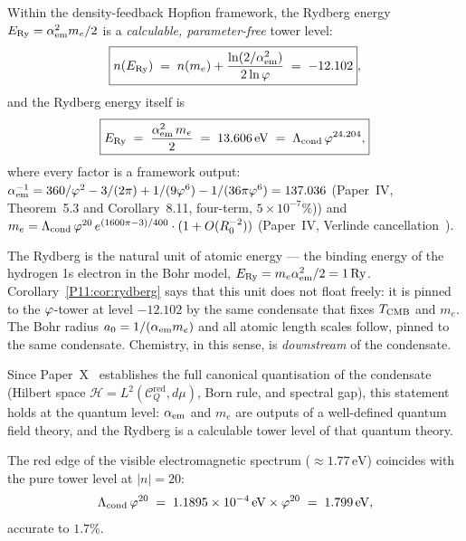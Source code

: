 \begin{corollary}
\label{P11:cor:rydberg}
Within the density-feedback Hopfion framework,
the Rydberg energy $E_{\mathrm{Ry}} = \alpha_{\mathrm{em}}^2 m_e/2$ is a
\emph{calculable, parameter-free} tower level:
\begin{equation}
  \boxed{n\!\left(E_{\mathrm{Ry}}\right)
  \;=\; n(m_e) + \frac{\ln(2/\alpha_{\mathrm{em}}^2)}{2\ln\varphi}
  \;=\; -12.102},
  \label{P11:eq:nRy}
\end{equation}
and the Rydberg energy itself is
\begin{equation}
  \boxed{
    E_{\mathrm{Ry}}
    \;=\; \frac{\alpha_{\mathrm{em}}^2\,m_e}{2}
    \;=\; 13.606\,\mathrm{eV}
    \;=\; \Lambda_{\mathrm{cond}}\,\varphi^{24.204},
  }
  \label{P11:eq:Ry_value}
\end{equation}
where every factor is a framework output:
$\alpha_{\mathrm{em}}^{-1} = 360/\varphi^2 - 3/(2\pi) + 1/(9\varphi^6) - 1/(36\pi\varphi^6)= 137.036$
(Paper~IV, Theorem~5.3 and Corollary~8.11, four-term, $5\times10^{-7}\%$)) and
$m_e = \Lambda_{\mathrm{cond}}\,\varphi^{20}\,e^{(1600\pi-3)/400}\cdot(1+O(R_0^{-2}))$
(Paper~IV, Verlinde cancellation~\cite{Paper4}).
\end{corollary}

\begin{remark}
\label{P11:rem:rydberg_physical}
The Rydberg is the natural unit of atomic energy — the binding energy
of the hydrogen 1s electron in the Bohr model,
$E_{\mathrm{Ry}} = m_e \alpha_{\mathrm{em}}^2/2 = 1\,\mathrm{Ry}$.
Corollary~\ref{P11:cor:rydberg} says that this unit does not float freely:
it is pinned to the $\varphi$-tower at level $-12.102$ by the same
condensate that fixes $T_{\mathrm{CMB}}$ and $m_e$.
The Bohr radius $a_0 = 1/(\alpha_{\mathrm{em}} m_e)$ and all atomic length scales
follow, pinned to the same condensate.
Chemistry, in this sense, is \emph{downstream} of the condensate.

Since Paper~X~\cite{Paper10} establishes the full canonical quantisation
of the condensate (Hilbert space $\mathcal{H}=L^2(\mathcal{C}_Q^\mathrm{red},d\mu)$,
Born rule, and spectral gap), this statement holds at the quantum level:
$\alpha_{\mathrm{em}}$ and $m_e$ are outputs of a well-defined quantum field theory,
and the Rydberg is a calculable tower level of that quantum theory.
\end{remark}

\begin{proposition}
\label{P11:prop:visible}
The red edge of the visible electromagnetic spectrum
($\approx 1.77\,\mathrm{eV}$) coincides with the
pure tower level at $|n|=20$:
\begin{equation}
  \Lambda_{\mathrm{cond}}\,\varphi^{20}
  \;=\; 1.1895\times10^{-4}\,\mathrm{eV}\times\varphi^{20}
  \;=\; 1.799\,\mathrm{eV},
  \label{P11:eq:red_light}
\end{equation}
accurate to $1.7\%$.
\end{proposition}

